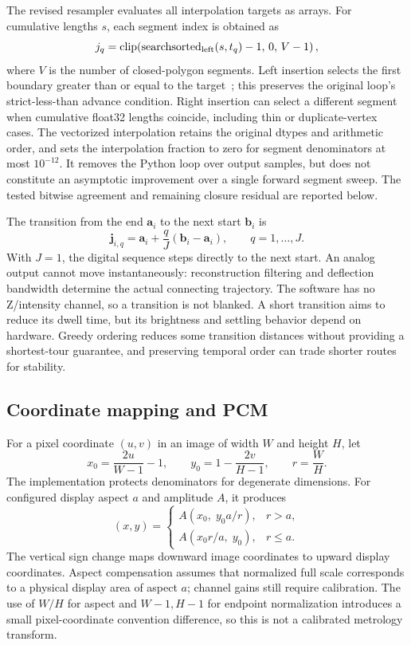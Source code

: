 \documentclass[11pt,a4paper]{article}
\begin{document}
The revised resampler evaluates all interpolation targets as arrays. For cumulative lengths $s$, each segment index is obtained as
\begin{equation}
 j_q=\operatorname{clip}\!\left(\operatorname{searchsorted}_{\rm left}(s,t_q)-1,\,0,\,V-1\right),
\end{equation}
where $V$ is the number of closed-polygon segments. Left insertion selects the first boundary greater than or equal to the target~\cite{numpysearch}; this preserves the original loop's strict-less-than advance condition. Right insertion can select a different segment when cumulative float32 lengths coincide, including thin or duplicate-vertex cases. The vectorized interpolation retains the original dtypes and arithmetic order, and sets the interpolation fraction to zero for segment denominators at most $10^{-12}$. It removes the Python loop over output samples, but does not constitute an asymptotic improvement over a single forward segment sweep. The tested bitwise agreement and remaining closure residual are reported below.

The transition from the end $\mathbf a_i$ to the next start $\mathbf b_i$ is
\begin{equation}
 \mathbf j_{i,q}=\mathbf a_i+\frac{q}{J}(\mathbf b_i-\mathbf a_i),
 \qquad q=1,\ldots,J.
 \label{eq:jump}
\end{equation}
With $J=1$, the digital sequence steps directly to the next start. An analog output cannot move instantaneously: reconstruction filtering and deflection bandwidth determine the actual connecting trajectory. The software has no Z/intensity channel, so a transition is not blanked. A short transition aims to reduce its dwell time, but its brightness and settling behavior depend on hardware. Greedy ordering reduces some transition distances without providing a shortest-tour guarantee, and preserving temporal order can trade shorter routes for stability.

\subsection{Coordinate mapping and PCM}
For a pixel coordinate $(u,v)$ in an image of width $W$ and height $H$, let
\begin{equation}
 x_0=\frac{2u}{W-1}-1,\qquad y_0=1-\frac{2v}{H-1},\qquad r=\frac WH.
\end{equation}
The implementation protects denominators for degenerate dimensions. For configured display aspect $a$ and amplitude $A$, it produces
\begin{equation}
 (x,y)=
 \begin{cases}
 A(x_0,\;y_0a/r), & r>a,\\
 A(x_0r/a,\;y_0), & r\leq a.
 \end{cases}
 \label{eq:mapping}
\end{equation}
The vertical sign change maps downward image coordinates to upward display coordinates. Aspect compensation assumes that normalized full scale corresponds to a physical display area of aspect $a$; channel gains still require calibration. The use of $W/H$ for aspect and $W-1,H-1$ for endpoint normalization introduces a small pixel-coordinate convention difference, so this is not a calibrated metrology transform.
\end{document}
